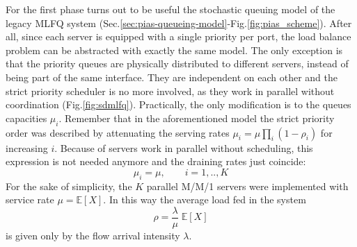 For the first phase turns out to be useful the stochastic queuing model of the legacy MLFQ system (Sec.\ref{sec:pias-queueing-model}-Fig.\ref{fig:pias_scheme}). After all, since each server is equipped with a single priority per port, the load balance problem can be abstracted with exactly the same model. The only exception is that the priority queues are physically distributed to different servers, instead of being part of the same interface. They are independent on each other and the strict priority scheduler is no more involved, as they work in parallel without coordination (Fig.\ref{fig:sdmlfq}). Practically, the only modification is to the queues capacities $\mu_i$. Remember that in the aforementioned model the strict priority order was described by attenuating the serving rates $\mu_i = \mu\prod_{i}(1-\rho_i)$ for increasing $i$. Because of servers work in parallel without scheduling, this expression is not needed anymore and the draining rates just coincide:
\[
\mu_i = \mu, \qquad i=1,..,K
\]
For the sake of simplicity, the $K$ parallel M/M/1 servers were implemented with service rate $\mu = \mathbb{E}[X]$. In this way the average load fed in the system 
\[
\rho = \frac{\lambda}{\mu}\;\mathbb{E}[X]
\]
is given only by the flow arrival intensity $\lambda$. \\
